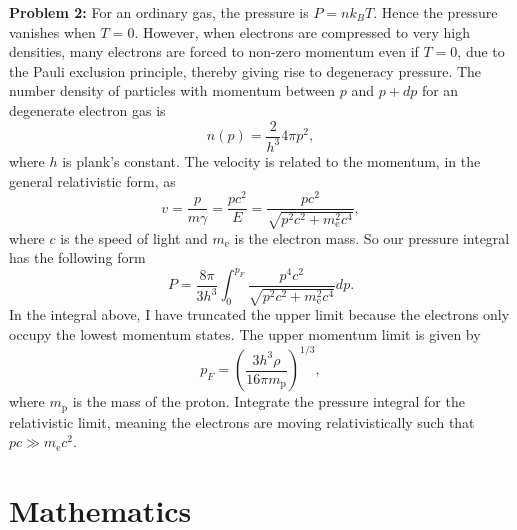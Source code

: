 \documentclass{article}
\begin{document}
\bigskip
\noindent
\textbf{Problem 2:}  For an ordinary gas, the pressure is $P=nk_BT$. Hence the pressure vanishes when $T=0$. However, when electrons are compressed to very high densities, many electrons are forced to non-zero momentum even if $T=0$, due to the Pauli exclusion principle, thereby giving rise to degeneracy pressure. The number density  of particles with momentum between $p$ and $p + dp$ for an degenerate electron gas is
\begin{equation*}
n(p) = \frac{2}{h^3}4\pi p^2,
\end{equation*}
where $h$ is plank's constant. The velocity is related to the momentum, in the general relativistic form, as
\begin{equation*}
v=\frac{p}{m\gamma} =\frac{pc^2}{E}=\frac{pc^2}{\sqrt{p^2c^2+m_\mathrm{e}^2c^4}},
\end{equation*}
where $c$ is the speed of light and $m_\mathrm{e}$ is the electron mass. So our pressure integral has the following form
\begin{equation*}
\label{Eq. Degenerate Pressure}
P = \frac{8\pi}{3h^3}\int_0^{p_F}\frac{p^4 c^2}{\sqrt{p^2 c^2+m_\mathrm{e}^2 c^4}}dp.
\end{equation*}
In the integral above, I have truncated the upper limit because the electrons only occupy the lowest momentum states. The upper momentum limit is given by
\begin{equation*}
p_F = \left(\frac{3h^3\rho}{16\pi m_\mathrm{p}}\right)^{1/3},
\end{equation*}
where $m_\mathrm{p}$ is the mass of the proton. Integrate the pressure integral for the relativistic limit, meaning the electrons are moving relativistically such that $pc \gg m_\mathrm{e}c^2$.



\section{Mathematics}
\end{document}
